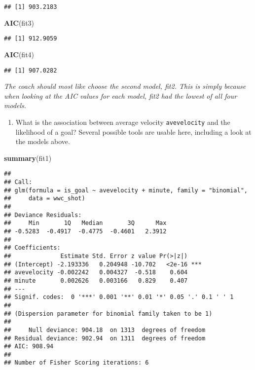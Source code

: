 \documentclass[]{article}
\newenvironment{Shaded}{\begin{snugshade}}{\end{snugshade}}
\newcommand{\KeywordTok}[1]{\textcolor[rgb]{0.13,0.29,0.53}{\textbf{#1}}}
\newcommand{\NormalTok}[1]{#1}
\providecommand{\tightlist}{%
  \setlength{\itemsep}{0pt}\setlength{\parskip}{0pt}}
\begin{document}
\begin{verbatim}
## [1] 903.2183
\end{verbatim}

\begin{Shaded}
\begin{Highlighting}[]
\KeywordTok{AIC}\NormalTok{(fit3)}
\end{Highlighting}
\end{Shaded}

\begin{verbatim}
## [1] 912.9059
\end{verbatim}

\begin{Shaded}
\begin{Highlighting}[]
\KeywordTok{AIC}\NormalTok{(fit4)}
\end{Highlighting}
\end{Shaded}

\begin{verbatim}
## [1] 907.0282
\end{verbatim}

\emph{The coach should most like choose the second model, fit2. This is
simply because when looking at the AIC values for each model, fit2 had
the lowest of all four models.}

\begin{enumerate}
\def\labelenumi{\arabic{enumi}.}
\setcounter{enumi}{3}
\tightlist
\item
  What is the association between average velocity \texttt{avevelocity}
  and the likelihood of a goal? Several possible tools are usable here,
  including a look at the models above.
\end{enumerate}

\begin{Shaded}
\begin{Highlighting}[]
\KeywordTok{summary}\NormalTok{(fit1)}
\end{Highlighting}
\end{Shaded}

\begin{verbatim}
## 
## Call:
## glm(formula = is_goal ~ avevelocity + minute, family = "binomial", 
##     data = wwc_shot)
## 
## Deviance Residuals: 
##     Min       1Q   Median       3Q      Max  
## -0.5283  -0.4917  -0.4775  -0.4601   2.3912  
## 
## Coefficients:
##              Estimate Std. Error z value Pr(>|z|)    
## (Intercept) -2.193336   0.204948 -10.702   <2e-16 ***
## avevelocity -0.002242   0.004327  -0.518    0.604    
## minute       0.002626   0.003166   0.829    0.407    
## ---
## Signif. codes:  0 '***' 0.001 '**' 0.01 '*' 0.05 '.' 0.1 ' ' 1
## 
## (Dispersion parameter for binomial family taken to be 1)
## 
##     Null deviance: 904.18  on 1313  degrees of freedom
## Residual deviance: 902.94  on 1311  degrees of freedom
## AIC: 908.94
## 
## Number of Fisher Scoring iterations: 6
\end{verbatim}
\end{document}
